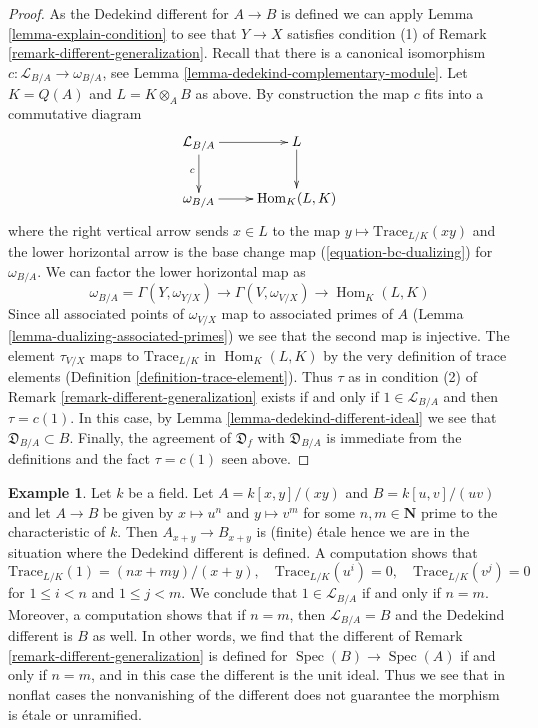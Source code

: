 \documentclass{stacks-project}
\theoremstyle{plain}
\theoremstyle{definition}
\newtheorem{example}[subsection]{Example}
\theoremstyle{remark}
\numberwithin{equation}{subsection}
\def\Spec{\mathop{\mathrm{Spec}}}
\def\Hom{\mathop{\mathrm{Hom}}\nolimits}
\begin{document}
\begin{proof}
As the Dedekind different for $A \to B$ is defined we can apply
Lemma \ref{lemma-explain-condition} to see that
$Y \to X$ satisfies condition (1) of
Remark \ref{remark-different-generalization}.
Recall that there is a canonical isomorphism
$c : \mathcal{L}_{B/A} \to \omega_{B/A}$, see
Lemma \ref{lemma-dedekind-complementary-module}.
Let $K = Q(A)$ and $L = K \otimes_A B$ as above.
By construction the map $c$ fits into a commutative diagram
$$
\xymatrix{
\mathcal{L}_{B/A} \ar[r] \ar[d]_c & L \ar[d] \\
\omega_{B/A} \ar[r] & \Hom_K(L, K)
}
$$
where the right vertical arrow sends $x \in L$ to the map
$y \mapsto \text{Trace}_{L/K}(xy)$ and the lower horizontal
arrow is the base change map (\ref{equation-bc-dualizing}) for $\omega_{B/A}$.
We can factor the lower horizontal map as
$$
\omega_{B/A} = \Gamma(Y, \omega_{Y/X})
\to \Gamma(V, \omega_{V/X}) \to \Hom_K(L, K)
$$
Since all associated points of $\omega_{V/X}$
map to associated primes of $A$
(Lemma \ref{lemma-dualizing-associated-primes})
we see that the second map is injective.
The element $\tau_{V/X}$ maps to $\text{Trace}_{L/K}$ in
$\Hom_K(L, K)$ by the very definition of trace elements
(Definition \ref{definition-trace-element}).
Thus $\tau$ as in condition (2) of
Remark \ref{remark-different-generalization}
exists if and only if $1 \in \mathcal{L}_{B/A}$ and then
$\tau = c(1)$. In this case, by Lemma \ref{lemma-dedekind-different-ideal}
we see that $\mathfrak{D}_{B/A} \subset B$.
Finally, the agreement of $\mathfrak{D}_f$ with $\mathfrak{D}_{B/A}$
is immediate from the definitions and the fact $\tau = c(1)$ seen above.
\end{proof}

\begin{example}
\label{example-no-different}
Let $k$ be a field. Let $A = k[x, y]/(xy)$ and $B = k[u, v]/(uv)$ and let
$A \to B$ be given by $x \mapsto u^n$ and $y \mapsto v^m$ for some
$n, m \in \mathbf{N}$ prime to the characteristic of $k$. Then
$A_{x + y} \to B_{x + y}$ is (finite) \'etale hence we are in the situation
where the Dedekind different is defined. A computation shows that
$$
\text{Trace}_{L/K}(1) = (nx + my)/(x + y),\quad
\text{Trace}_{L/K}(u^i) = 0,\quad \text{Trace}_{L/K}(v^j) = 0
$$
for $1 \leq i < n$ and $1 \leq j < m$. We conclude that
$1 \in \mathcal{L}_{B/A}$ if and only if $n = m$. Moreover, a
computation shows that if $n = m$, then $\mathcal{L}_{B/A} = B$
and the Dedekind different is $B$ as well. In other words, we find that
the different of Remark \ref{remark-different-generalization}
is defined for $\Spec(B) \to \Spec(A)$
if and only if $n = m$, and in this case the different is the
unit ideal. Thus we see that in nonflat cases the nonvanishing
of the different does not guarantee the morphism is \'etale or unramified.
\end{example}
\end{document}

